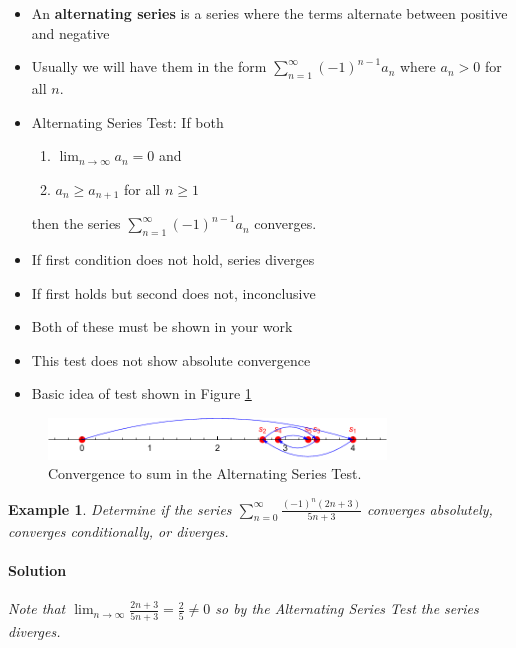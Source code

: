 \documentclass[letterpaper, 11pt, openany]{book}
\theoremstyle{mytheoremstyle}
\theoremstyle{myexamplestyle}
\newtheorem{example}{Example}[section]
\newenvironment{solution}{\paragraph{\sffamily \smaller \fontseries{b}\selectfont Solution}}{\hfill\faSquare}
\begin{document}
\begin{itemize}
    \item An \textbf{alternating series} is a series where the terms alternate between positive and negative
    \item Usually we will have them in the form $\displaystyle \sum_{n=1}^{\infty} (-1)^{n-1} a_{n}$ where $a_{n} > 0$ for all $n$.
    \item Alternating Series Test: If both
    \begin{enumerate}
        \item $\displaystyle \lim_{n \to \infty} a_{n} = 0$ and
        \item $a_{n} \geq a_{n+1}$ for all $n \geq 1$
    \end{enumerate}
    then the series $\displaystyle \sum_{n=1}^{\infty} (-1)^{n-1} a_{n}$ converges.
    \item If first condition does not hold, series diverges
    \item If first holds but second does not, inconclusive
    \item[{\faExclamationTriangle[solid]}] Both of these must be shown in your work
    \item[{\faExclamationTriangle[solid]}] This test does not show absolute convergence
    \item Basic idea of test shown in Figure \ref{f:altseriestest}
\end{itemize}

\begin{figure}[htbp]
    \centering
        \includegraphics[width=0.8\textwidth]{Figures/altseriestest.pdf}
    \caption{Convergence to sum in the Alternating Series Test.}
    \label{f:altseriestest}
\end{figure}

\begin{example}\label{e:altseriesdiv}
    Determine if the series $\displaystyle \sum_{n = 0}^{\infty} \frac{(-1)^{n}(2n+3)}{5n + 3}$ converges absolutely, converges conditionally, or diverges.

    \begin{solution}
        Note that $\displaystyle \lim_{n \to \infty} \frac{2n+3}{5n+3} = \frac{2}{5} \neq 0$ so by the Alternating Series Test the series diverges.
    \end{solution}
\end{example}
\end{document}
